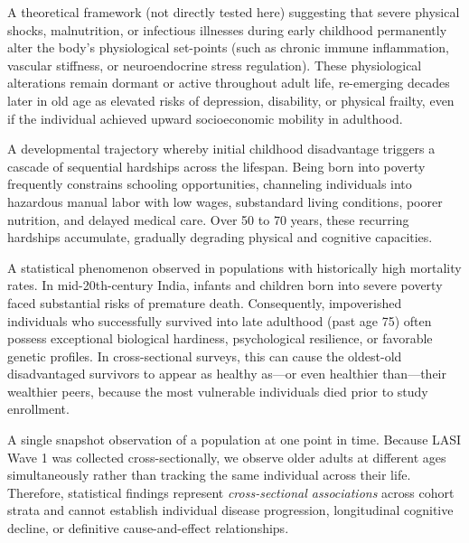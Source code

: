 \documentclass[11pt,a4paper]{article}
\begin{document}
\begin{description}[leftmargin=0.5cm, style=nextline]
    \item[\textbf{Biological Vulnerability (Sensitive / Critical Period Model):}]
    A theoretical framework (not directly tested here) suggesting that severe physical shocks, malnutrition, or infectious illnesses during early childhood permanently alter the body's physiological set-points (such as chronic immune inflammation, vascular stiffness, or neuroendocrine stress regulation). These physiological alterations remain dormant or active throughout adult life, re-emerging decades later in old age as elevated risks of depression, disability, or physical frailty, even if the individual achieved upward socioeconomic mobility in adulthood.

    \item[\textbf{Accumulation of Disadvantage (Cumulative Adversity):}]
    A developmental trajectory whereby initial childhood disadvantage triggers a cascade of sequential hardships across the lifespan. Being born into poverty frequently constrains schooling opportunities, channeling individuals into hazardous manual labor with low wages, substandard living conditions, poorer nutrition, and delayed medical care. Over 50 to 70 years, these recurring hardships accumulate, gradually degrading physical and cognitive capacities.

    \item[\textbf{Selective Survival (Mortality Selection / Survivor Bias):}]
    A statistical phenomenon observed in populations with historically high mortality rates. In mid-20th-century India, infants and children born into severe poverty faced substantial risks of premature death. Consequently, impoverished individuals who successfully survived into late adulthood (past age 75) often possess exceptional biological hardiness, psychological resilience, or favorable genetic profiles. In cross-sectional surveys, this can cause the oldest-old disadvantaged survivors to appear as healthy as---or even healthier than---their wealthier peers, because the most vulnerable individuals died prior to study enrollment.

    \item[\textbf{Cross-Sectional Baseline (Non-Causal Guardrail):}]
    A single snapshot observation of a population at one point in time. Because LASI Wave 1 was collected cross-sectionally, we observe older adults at different ages simultaneously rather than tracking the same individual across their life. Therefore, statistical findings represent \textit{cross-sectional associations} across cohort strata and cannot establish individual disease progression, longitudinal cognitive decline, or definitive cause-and-effect relationships.
\end{description}
\end{document}

